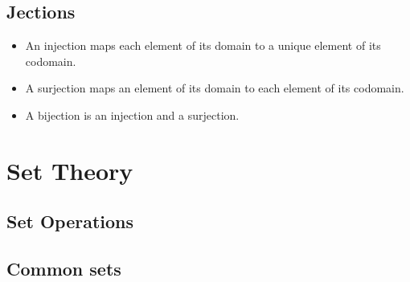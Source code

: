 \documentclass[a4paper,11pt]{article}
\begin{document}

    \subsection{Jections}


    \begin{itemize}
    \item An injection maps each element of its domain to a unique element of
          its codomain.
    \item A surjection maps an element of its domain to each element of its
          codomain.
    \item A bijection is an injection and a surjection.
    \end{itemize}

    \section{Set Theory}

    \subsection{Set Operations}

    \subsection{Common sets}

\end{document}
